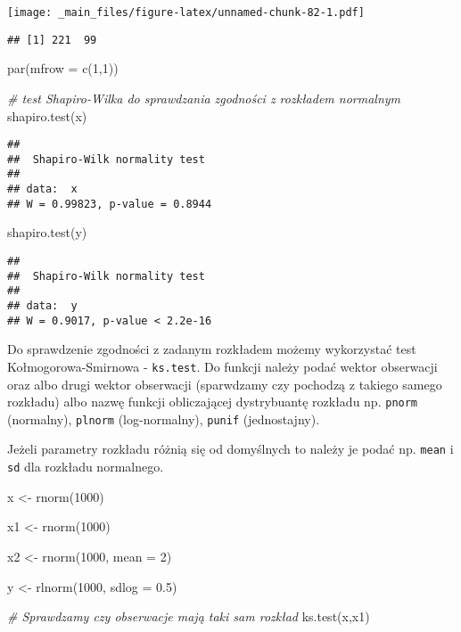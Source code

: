 \documentclass[
]{book}
\newenvironment{Shaded}{\begin{snugshade}}{\end{snugshade}}
\newcommand{\AttributeTok}[1]{\textcolor[rgb]{0.77,0.63,0.00}{#1}}
\newcommand{\CommentTok}[1]{\textcolor[rgb]{0.56,0.35,0.01}{\textit{#1}}}
\newcommand{\DecValTok}[1]{\textcolor[rgb]{0.00,0.00,0.81}{#1}}
\newcommand{\FloatTok}[1]{\textcolor[rgb]{0.00,0.00,0.81}{#1}}
\newcommand{\FunctionTok}[1]{\textcolor[rgb]{0.00,0.00,0.00}{#1}}
\newcommand{\NormalTok}[1]{#1}
\newcommand{\OtherTok}[1]{\textcolor[rgb]{0.56,0.35,0.01}{#1}}
\begin{document}
\texttt{[image: \_main\_files/figure-latex/unnamed-chunk-82-1.pdf]}

\begin{verbatim}
## [1] 221  99
\end{verbatim}

\begin{Shaded}
\begin{Highlighting}[]
\FunctionTok{par}\NormalTok{(}\AttributeTok{mfrow =} \FunctionTok{c}\NormalTok{(}\DecValTok{1}\NormalTok{,}\DecValTok{1}\NormalTok{))}

\CommentTok{\# test Shapiro{-}Wilka do sprawdzania zgodności z rozkładem normalnym}
\FunctionTok{shapiro.test}\NormalTok{(x)}
\end{Highlighting}
\end{Shaded}

\begin{verbatim}
## 
##  Shapiro-Wilk normality test
## 
## data:  x
## W = 0.99823, p-value = 0.8944
\end{verbatim}

\begin{Shaded}
\begin{Highlighting}[]
\FunctionTok{shapiro.test}\NormalTok{(y)}
\end{Highlighting}
\end{Shaded}

\begin{verbatim}
## 
##  Shapiro-Wilk normality test
## 
## data:  y
## W = 0.9017, p-value < 2.2e-16
\end{verbatim}

Do sprawdzenie zgodności z zadanym rozkładem możemy wykorzystać test Kołmogorowa-Smirnowa - \texttt{ks.test}. Do funkcji należy podać wektor obserwacji oraz albo drugi wektor obserwacji (sparwdzamy czy pochodzą z takiego samego rozkładu) albo nazwę funkcji obliczającej dystrybuantę rozkładu np. \texttt{pnorm} (normalny), \texttt{plnorm} (log-normalny), \texttt{punif} (jednostajny).

Jeżeli parametry rozkładu różnią się od domyślnych to należy je podać np. \texttt{mean} i \texttt{sd} dla rozkładu normalnego.

\begin{Shaded}
\begin{Highlighting}[]
\NormalTok{x }\OtherTok{\textless{}{-}} \FunctionTok{rnorm}\NormalTok{(}\DecValTok{1000}\NormalTok{)}

\NormalTok{x1 }\OtherTok{\textless{}{-}} \FunctionTok{rnorm}\NormalTok{(}\DecValTok{1000}\NormalTok{)}

\NormalTok{x2 }\OtherTok{\textless{}{-}} \FunctionTok{rnorm}\NormalTok{(}\DecValTok{1000}\NormalTok{, }\AttributeTok{mean =} \DecValTok{2}\NormalTok{)}

\NormalTok{y }\OtherTok{\textless{}{-}} \FunctionTok{rlnorm}\NormalTok{(}\DecValTok{1000}\NormalTok{, }\AttributeTok{sdlog =} \FloatTok{0.5}\NormalTok{)}

\CommentTok{\# Sprawdzamy czy obserwacje mają taki sam rozkład}
\FunctionTok{ks.test}\NormalTok{(x,x1)}
\end{Highlighting}
\end{Shaded}
\end{document}
